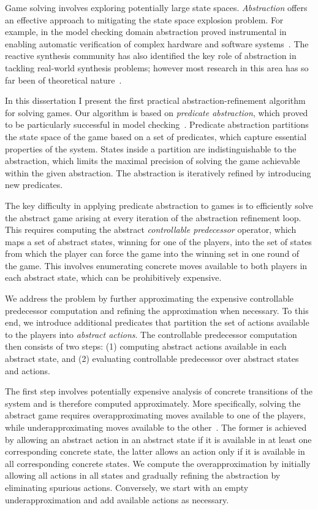 Game solving involves exploring potentially large state spaces. \emph{Abstraction} offers an effective approach to mitigating the state space explosion problem.  For example, in the model checking domain abstraction proved instrumental in enabling automatic verification of complex hardware and software systems~\cite{Clarke_GJLV_00,Clarke_KSY_04,Henzinger_JMS_02}.  The reactive synthesis community has also identified the key role of abstraction in tackling real-world synthesis problems; however most research in this area has so far been of theoretical nature~\cite{Alfaro_Roy_07,Henzinger_JM_03}.  

In this dissertation I present the first practical abstraction-refinement algorithm for solving games.  Our algorithm is based on \emph{predicate abstraction}, which proved to be particularly successful in model checking~\cite{Graf_Saidi_97}.  Predicate abstraction partitions the state space of the game based on a set of predicates, which capture essential properties of the system.  States inside a partition are indistinguishable to the abstraction, which limits the maximal precision of solving the game achievable within the given abstraction.  The abstraction is iteratively refined by introducing new predicates.

The key difficulty in applying predicate abstraction to games is to efficiently solve the abstract game arising at every iteration of the abstraction refinement loop.  This requires computing the abstract \emph{controllable predecessor} operator, which maps a set of abstract states, winning for one of the players, into the set of states from which the player can force the game into the winning set in one round of the game.  This involves enumerating concrete moves available to both players in each abstract state, which can be prohibitively expensive.  

We address the problem by further approximating the expensive controllable predecessor computation and refining the approximation when necessary. To this end, we introduce additional predicates that partition the set of actions available to the players into \emph{abstract actions}.  The controllable predecessor computation then consists of two steps: (1) computing abstract actions available in each abstract state, and (2) evaluating controllable predecessor over abstract states and actions.  

The first step involves potentially expensive analysis of concrete transitions of the system and is therefore computed approximately.  More specifically, solving the abstract game requires overapproximating moves available to one of the players, while underapproximating moves available to the other~\cite{Henzinger_JM_03}.  The former is achieved by allowing an abstract action in an abstract state if it is available in at least one corresponding concrete state, the latter allows an action only if it is available in all corresponding concrete states.  We compute the overapproximation by initially allowing all actions in all states and gradually refining the abstraction by eliminating spurious actions.  Conversely, we start with an empty underapproximation and add available actions as necessary.

